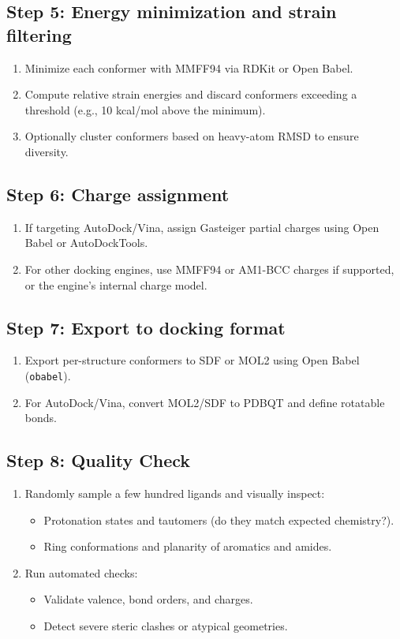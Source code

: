 \documentclass[12pt, a4paper]{article}
\begin{document}
\subsection{Step 5: Energy minimization and strain filtering}

\begin{enumerate}
  \item Minimize each conformer with MMFF94 via RDKit or Open Babel.
  \item Compute relative strain energies and discard conformers exceeding a threshold (e.g., 10 kcal/mol above the minimum).
  \item Optionally cluster conformers based on heavy-atom RMSD to ensure diversity.
\end{enumerate}

\subsection{Step 6: Charge assignment}

\begin{enumerate}
  \item If targeting AutoDock/Vina, assign Gasteiger partial charges using Open Babel or AutoDockTools.
  \item For other docking engines, use MMFF94 or AM1-BCC charges if supported, or the engine's internal charge model.
\end{enumerate}

\subsection{Step 7: Export to docking format}

\begin{enumerate}
  \item Export per-structure conformers to SDF or MOL2 using Open Babel (\verb|obabel|).
  \item For AutoDock/Vina, convert MOL2/SDF to PDBQT and define rotatable bonds.
\end{enumerate}

\subsection{Step 8: Quality Check}

\begin{enumerate}
  \item Randomly sample a few hundred ligands and visually inspect:
  \begin{itemize}
    \item Protonation states and tautomers (do they match expected chemistry?).
    \item Ring conformations and planarity of aromatics and amides.
  \end{itemize}
  \item Run automated checks:
  \begin{itemize}
    \item Validate valence, bond orders, and charges.
    \item Detect severe steric clashes or atypical geometries.
  \end{itemize}
\end{enumerate}
\end{document}
